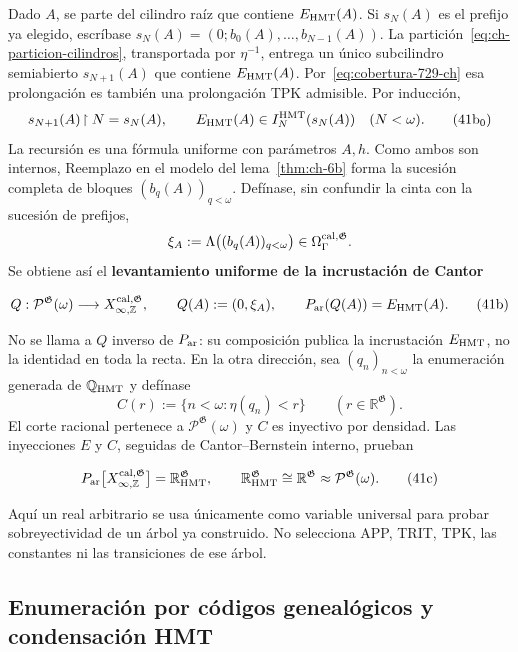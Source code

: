 Dado \(A\), se parte del cilindro raíz que contiene \(E_{\rm HMT}(A)\). Si
\(s_N(A)\) es el prefijo ya elegido, escríbase
\(s_N(A)=(0;b_0(A),\ldots,b_{N-1}(A))\). La partición~\eqref{eq:ch-particion-cilindros}, transportada
por \(\eta^{-1}\), entrega un único subcilindro semiabierto
\(s_{N+1}(A)\) que contiene \(E_{\rm HMT}(A)\). Por~\eqref{eq:cobertura-729-ch} esa prolongación es
también una prolongación TPK admisible. Por inducción,
\[
 s_{N+1}(A)\!\upharpoonright N=s_N(A),\qquad
 E_{\rm HMT}(A)\in I_N^{\rm HMT}(s_N(A))\quad(N<\omega).
\tag{41b$_0$}\label{eq:ch-prefijos-uniformes}
\]
La recursión es una fórmula uniforme con parámetros \(A,h\). Como ambos son
internos, Reemplazo en el modelo del lema~\ref{thm:ch-6b} forma la sucesión completa de
bloques \((b_q(A))_{q<\omega}\). Defínase, sin confundir la cinta con la
sucesión de prefijos,
\[
 \xi_A:=\Lambda\bigl((b_q(A))_{q<\omega}\bigr)
 \in\Omega_\Gamma^{\rm cal,\mathfrak G}.
\]
Se obtiene así el \textbf{levantamiento uniforme de la incrustación de Cantor}

\[
 Q:\mathcal P^{\mathfrak G}(\omega)
 \longrightarrow X_{\infty,\mathbb Z}^{\rm cal,\mathfrak G},
 \qquad
 Q(A):=(0,\xi_A),\qquad
 P_{\rm ar}(Q(A))=E_{\rm HMT}(A).
\tag{41b}\label{eq:ch-levantamiento-uniforme}
\]

No se llama a \(Q\) inverso de \(P_{\rm ar}\): su composición publica la
incrustación \(E_{\rm HMT}\), no la identidad en toda la recta. En la otra
dirección, sea \((q_n)_{n<\omega}\) la enumeración generada de
\(\mathbb Q_{\rm HMT}\) y defínase
\[
 C(r):=\{n<\omega:\eta(q_n)<r\}
 \qquad(r\in\mathbb R^{\mathfrak G}).
\]
El corte racional pertenece a \(\mathcal P^{\mathfrak G}(\omega)\) y
\(C\) es inyectivo por densidad. Las inyecciones \(E\) y \(C\), seguidas de
Cantor--Bernstein interno, prueban

\[
 P_{\rm ar}
 \bigl[X_{\infty,\mathbb Z}^{\rm cal,\mathfrak G}\bigr]
 =\mathbb R_{\rm HMT}^{\mathfrak G},
 \qquad
 \mathbb R_{\rm HMT}^{\mathfrak G}
 \cong\mathbb R^{\mathfrak G}
 \approx\mathcal P^{\mathfrak G}(\omega).
\tag{41c}\label{eq:ch-recta-potencia}
\]

Aquí un real arbitrario se usa únicamente como variable universal para probar
sobreyectividad de un árbol ya construido. No selecciona APP, TRIT, TPK, las
constantes ni las transiciones de ese árbol.

\subsection{Enumeración por códigos genealógicos y condensación HMT}

